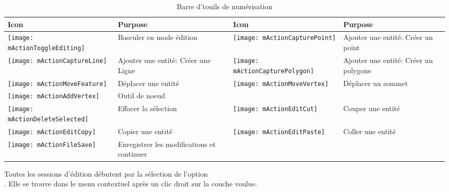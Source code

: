 \begin{table}[ht]
\centering

\begin{tabular}{|l|p{5.5cm}|l|p{5.5cm}|}
\hline \textbf{Icon} & \textbf{Purpose} & \textbf{Icon} & \textbf{Purpose} \\
\hline \texttt{[image: mActionToggleEditing]}
   & Basculer en mode édition
   & \texttt{[image: mActionCapturePoint]}
   & Ajouter une entité: Créer un point \\
\hline \texttt{[image: mActionCaptureLine]}
   & Ajouter une entité: Créer une Ligne
   & \texttt{[image: mActionCapturePolygon]}
   & Ajouter une entité: Créer un polygone \\
\hline \texttt{[image: mActionMoveFeature]}
   & Déplacer une entité
   & \texttt{[image: mActionMoveVertex]}
   & Déplacer un sommet\\
\hline \texttt{[image: mActionAddVertex]}
   & Outil de noeud \\
\hline \texttt{[image: mActionDeleteSelected]}
   & Effacer la sélection
   & \texttt{[image: mActionEditCut]}
   & Couper une entité \\
\hline \texttt{[image: mActionEditCopy]}
   & Copier une entité 
   & \texttt{[image: mActionEditPaste]} 
   & Coller une entité \\
\hline \texttt{[image: mActionFileSave]}
   & Enregistrer les modifications et continuer
   &  &  \\
\hline
\end{tabular}
\caption{Barre d'touils de numérisation}\label{tab:vector_editing}
\end{table}


Toutes les sessions d'édition débutent par la sélection de l'option\\ . Elle se trouve dans le menu contextuel après un clic droit sur la couche voulue.


